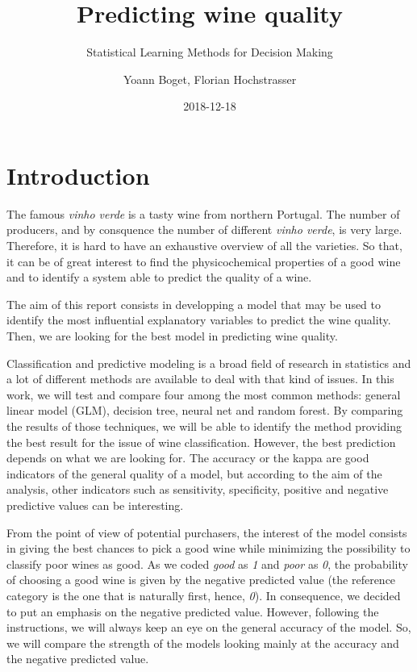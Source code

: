 \documentclass[11pt,]{article}
\title{Predicting wine quality}
\subtitle{Statistical Learning Methods for Decision Making}
\author{Yoann Boget, Florian Hochstrasser}
\date{2018-12-18}
\begin{document}
\maketitle

\newpage

{
\setcounter{tocdepth}{2}
\tableofcontents
}
\clearpage

\hypertarget{introduction}{%
\section{Introduction}\label{introduction}}

The famous \emph{vinho verde} is a tasty wine from northern Portugal.
The number of producers, and by consquence the number of different
\emph{vinho verde}, is very large. Therefore, it is hard to have an
exhaustive overview of all the varieties. So that, it can be of great
interest to find the physicochemical properties of a good wine and to
identify a system able to predict the quality of a wine.

The aim of this report consists in developping a model that may be used
to identify the most influential explanatory variables to predict the
wine quality. Then, we are looking for the best model in predicting wine
quality.

Classification and predictive modeling is a broad field of research in
statistics and a lot of different methods are available to deal with
that kind of issues. In this work, we will test and compare four among
the most common methods: general linear model (GLM), decision tree,
neural net and random forest. By comparing the results of those
techniques, we will be able to identify the method providing the best
result for the issue of wine classification. However, the best
prediction depends on what we are looking for. The accuracy or the kappa
are good indicators of the general quality of a model, but according to
the aim of the analysis, other indicators such as sensitivity,
specificity, positive and negative predictive values can be interesting.

From the point of view of potential purchasers, the interest of the
model consists in giving the best chances to pick a good wine while
minimizing the possibility to classify poor wines as good. As we coded
\emph{good} as \emph{1} and \emph{poor} as \emph{0}, the probability of
choosing a good wine is given by the negative predicted value (the
reference category is the one that is naturally first, hence, \emph{0}).
In consequence, we decided to put an emphasis on the negative predicted
value. However, following the instructions, we will always keep an eye
on the general accuracy of the model. So, we will compare the strength
of the models looking mainly at the accuracy and the negative predicted
value.
\end{document}
